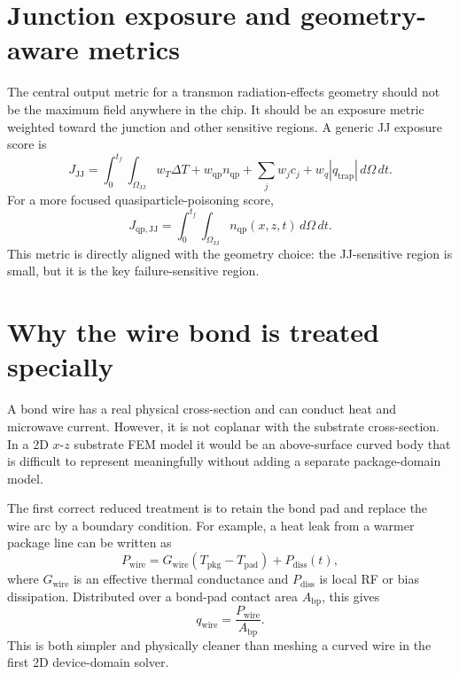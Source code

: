 \documentclass[11pt]{article}
\begin{document}
\section{Junction exposure and geometry-aware metrics}
The central output metric for a transmon radiation-effects geometry should not be the maximum field anywhere in the chip. It should be an exposure metric weighted toward the junction and other sensitive regions. A generic JJ exposure score is
\begin{equation}
    J_{\mathrm{JJ}} = \int_0^{t_f}\int_{\Omega_{\mathrm{JJ}}} w_T\Delta T + w_{\mathrm{qp}}n_{\mathrm{qp}} + \sum_j w_j c_j + w_q |q_{\mathrm{trap}}|\, d\Omega\,dt.
\end{equation}
For a more focused quasiparticle-poisoning score,
\begin{equation}
    J_{\mathrm{qp,JJ}} = \int_0^{t_f}\int_{\Omega_{\mathrm{JJ}}} n_{\mathrm{qp}}(x,z,t)\,d\Omega\,dt.
\end{equation}
This metric is directly aligned with the geometry choice: the JJ-sensitive region is small, but it is the key failure-sensitive region.

\section{Why the wire bond is treated specially}
A bond wire has a real physical cross-section and can conduct heat and microwave current. However, it is not coplanar with the substrate cross-section. In a 2D $x$-$z$ substrate FEM model it would be an above-surface curved body that is difficult to represent meaningfully without adding a separate package-domain model.

The first correct reduced treatment is to retain the bond pad and replace the wire arc by a boundary condition. For example, a heat leak from a warmer package line can be written as
\begin{equation}
    P_{\mathrm{wire}} = G_{\mathrm{wire}}(T_{\mathrm{pkg}}-T_{\mathrm{pad}}) + P_{\mathrm{diss}}(t),
\end{equation}
where $G_{\mathrm{wire}}$ is an effective thermal conductance and $P_{\mathrm{diss}}$ is local RF or bias dissipation. Distributed over a bond-pad contact area $A_{\mathrm{bp}}$, this gives
\begin{equation}
    q_{\mathrm{wire}} = \frac{P_{\mathrm{wire}}}{A_{\mathrm{bp}}}.
\end{equation}
This is both simpler and physically cleaner than meshing a curved wire in the first 2D device-domain solver.
\end{document}
